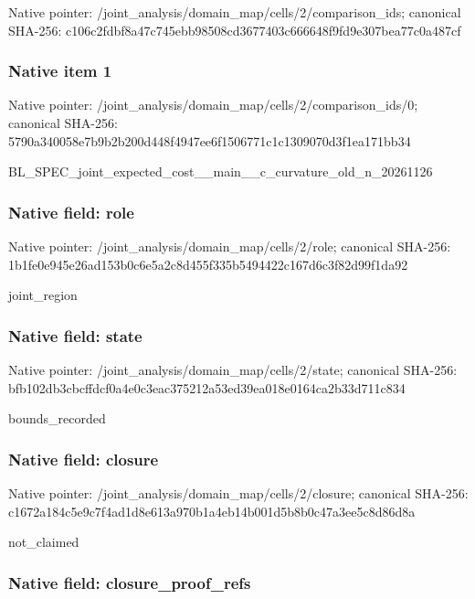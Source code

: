 \documentclass[10pt,a4paper]{article}
\begin{document}
Native pointer: /joint\_analysis/domain\_m\allowbreak{}ap/cells/2/comparison\_id\allowbreak{}s; canonical SHA-256: c106c2fdbf8a47c745ebb985\allowbreak{}08cd3677403c666648f9fd9e\allowbreak{}307bea77c0a487cf



\subsubsection{Native item 1}


Native pointer: /joint\_analysis/domain\_m\allowbreak{}ap/cells/2/comparison\_id\allowbreak{}s/0; canonical SHA-256: 5790a340058e7b9b2b200d44\allowbreak{}8f4947ee6f1506771c1c1309\allowbreak{}070d3f1ea171bb34


BL\_SPEC\_joint\_expected\_c\allowbreak{}ost\_\_main\_\_c\_curvature\_o\allowbreak{}ld\_n\_20261126


\subsubsection{Native field: role}


Native pointer: /joint\_analysis/domain\_map/cells/2/role; canonical SHA-256: 1b1fe0e945e26ad153b0c6e5\allowbreak{}a2c8d455f335b5494422c167\allowbreak{}d6c3f82d99f1da92


joint\_region


\subsubsection{Native field: state}


Native pointer: /joint\_analysis/domain\_m\allowbreak{}ap/cells/2/state; canonical SHA-256: bfb102db3cbcffdcf0a4e0c3\allowbreak{}eac375212a53ed39ea018e01\allowbreak{}64ca2b33d711c834


bounds\_recorded


\subsubsection{Native field: closure}


Native pointer: /joint\_analysis/domain\_m\allowbreak{}ap/cells/2/closure; canonical SHA-256: c1672a184c5e9c7f4ad1d8e6\allowbreak{}13a970b1a4eb14b001d5b8b0\allowbreak{}c47a3ee5c8d86d8a


not\_claimed


\subsubsection{Native field: closure\_proof\_refs}
\end{document}
